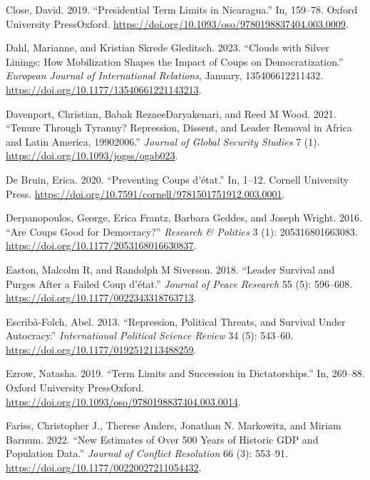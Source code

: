 \documentclass[
  12pt,
]{report}
\newlength{\cslhangindent}
\newenvironment{CSLReferences}[2] %
 {\begin{list}{}{%
  \setlength{\itemindent}{0pt}
  \setlength{\leftmargin}{0pt}
  \setlength{\parsep}{0pt}
  \ifodd #1
   \setlength{\leftmargin}{\cslhangindent}
   \setlength{\itemindent}{-1\cslhangindent}
  \fi
  \setlength{\itemsep}{#2\baselineskip}}}
 {\end{list}}
\begin{document}
\begin{CSLReferences}{1}{0}
Close, David. 2019. {``Presidential Term Limits in Nicaragua.''} In,
159--78. Oxford University PressOxford.
\url{https://doi.org/10.1093/oso/9780198837404.003.0009}.

Dahl, Marianne, and Kristian Skrede Gleditsch. 2023. {``Clouds with
Silver Linings: How Mobilization Shapes the Impact of Coups on
Democratization.''} \emph{European Journal of International Relations},
January, 135406612211432.
\url{https://doi.org/10.1177/13540661221143213}.

Davenport, Christian, Babak RezaeeDaryakenari, and Reed M Wood. 2021.
{``Tenure Through Tyranny? Repression, Dissent, and Leader Removal in
Africa and Latin America, 1990{\textendash}2006.''} \emph{Journal of
Global Security Studies} 7 (1).
\url{https://doi.org/10.1093/jogss/ogab023}.

De Bruin, Erica. 2020. {``Preventing Coups d{'}état.''} In, 1--12.
Cornell University Press.
\url{https://doi.org/10.7591/cornell/9781501751912.003.0001}.

Derpanopoulos, George, Erica Frantz, Barbara Geddes, and Joseph Wright.
2016. {``Are Coups Good for Democracy?''} \emph{Research \& Politics} 3
(1): 205316801663083. \url{https://doi.org/10.1177/2053168016630837}.

Easton, Malcolm R, and Randolph M Siverson. 2018. {``Leader Survival and
Purges After a Failed Coup d{'}état.''} \emph{Journal of Peace Research}
55 (5): 596--608. \url{https://doi.org/10.1177/0022343318763713}.

Escribà-Folch, Abel. 2013. {``Repression, Political Threats, and
Survival Under Autocracy.''} \emph{International Political Science
Review} 34 (5): 543--60. \url{https://doi.org/10.1177/0192512113488259}.

Ezrow, Natasha. 2019. {``Term Limits and Succession in Dictatorships.''}
In, 269--88. Oxford University PressOxford.
\url{https://doi.org/10.1093/oso/9780198837404.003.0014}.

Fariss, Christopher J., Therese Anders, Jonathan N. Markowitz, and
Miriam Barnum. 2022. {``New Estimates of Over 500 Years of Historic GDP
and Population Data.''} \emph{Journal of Conflict Resolution} 66 (3):
553--91. \url{https://doi.org/10.1177/00220027211054432}.


\end{CSLReferences}
\end{document}
